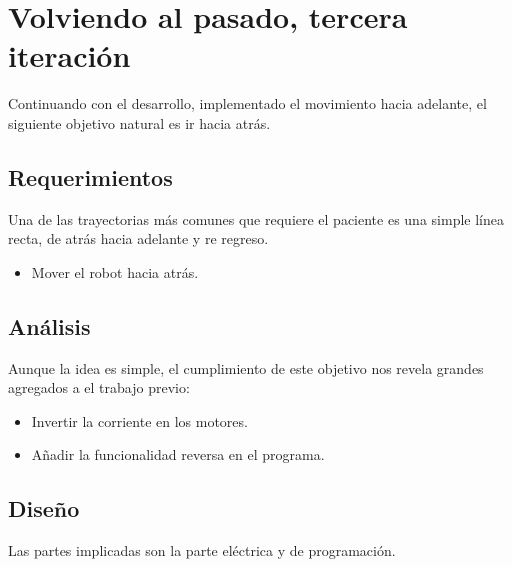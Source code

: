 \chapter{Volviendo al pasado, tercera iteración}
Continuando con el desarrollo, implementado el movimiento hacia adelante, el 
siguiente objetivo natural es ir hacia atrás.
\section{Requerimientos}
Una de las trayectorias más comunes que requiere el paciente es una simple línea
recta, de atrás hacia adelante y re regreso.
\begin{itemize}
	\item Mover el robot hacia atrás.
\end{itemize}
\section{Análisis}
Aunque la idea es simple, el cumplimiento de este objetivo nos revela grandes 
agregados a el trabajo previo:
\begin{itemize}
	\item Invertir la corriente en los motores.
	\item Añadir la funcionalidad reversa en el programa.
\end{itemize}
\section{Diseño}
Las partes implicadas son la parte eléctrica y de programación.
